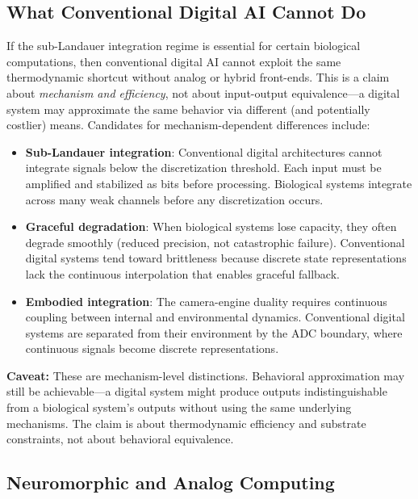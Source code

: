 \documentclass[12pt]{article}
\numberwithin{equation}{section}
\begin{document}
\subsection{What Conventional Digital AI Cannot Do}

If the sub-Landauer integration regime is essential for certain biological computations, then conventional digital AI cannot exploit the same thermodynamic shortcut without analog or hybrid front-ends. This is a claim about \emph{mechanism and efficiency}, not about input-output equivalence---a digital system may approximate the same behavior via different (and potentially costlier) means. Candidates for mechanism-dependent differences include:

\begin{itemize}
\item \textbf{Sub-Landauer integration}: Conventional digital architectures cannot integrate signals below the discretization threshold. Each input must be amplified and stabilized as bits before processing. Biological systems integrate across many weak channels before any discretization occurs.

\item \textbf{Graceful degradation}: When biological systems lose capacity, they often degrade smoothly (reduced precision, not catastrophic failure). Conventional digital systems tend toward brittleness because discrete state representations lack the continuous interpolation that enables graceful fallback.

\item \textbf{Embodied integration}: The camera-engine duality requires continuous coupling between internal and environmental dynamics. Conventional digital systems are separated from their environment by the ADC boundary, where continuous signals become discrete representations.
\end{itemize}

\textbf{Caveat:} These are mechanism-level distinctions. Behavioral approximation may still be achievable---a digital system might produce outputs indistinguishable from a biological system's outputs without using the same underlying mechanisms. The claim is about thermodynamic efficiency and substrate constraints, not about behavioral equivalence.

\subsection{Neuromorphic and Analog Computing}
\label{sec:neuromorphic}
\end{document}

